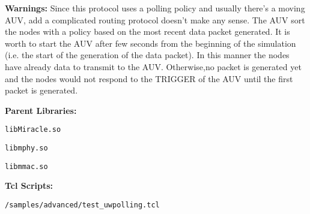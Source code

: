 \begin{description}
   \item {\bf Warnings:} Since this protocol uses a polling policy and usually there's a moving AUV, add a complicated routing protocol doesn't make any sense. The AUV sort the nodes with a policy based on the most recent data packet generated. 
    It is worth to start the AUV after few seconds from the beginning of the simulation (i.e. the start of the generation of the data packet). 
    In this manner the nodes have already data to transmit to the AUV. Otherwise,no packet is generated yet and the nodes would not respond to the TRIGGER of the AUV until the first packet is generated.
   \item {\bf Parent Libraries:}
         \begin{description}
          \item {\tt libMiracle.so}
	       \item {\tt libmphy.so} 
	       \item {\tt libmmac.so}
        \end{description}
   \item {\bf Tcl Scripts:} 
    \begin{description}
      \item {\tt /samples/advanced/test\_uwpolling.tcl}
    \end{description}
\end{description}

\vspace{1 cm}

